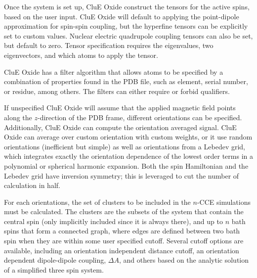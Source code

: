 \documentclass{book}
\begin{document}
Once the system is set up, CluE Oxide construct the tensors for the active spins,
based on the user input.  CluE Oxide will default to applying the point-dipole 
approximation for spin-spin coupling, but the hyperfine tensors can be 
explicitly set to custom values.  
Nuclear electric quadrupole coupling tensors can also be set, but default to 
zero.  Tensor specification requires the eigenvalues, two eigenvectors,
and which atoms to apply the tensor.

CluE Oxide has a filter algorithm that allows atoms to be specified by a combination 
of properties found in the PDB file, such as element, serial number, or residue,
among others.  The filters can either require or forbid qualifiers.
  
If unspecified CluE Oxide will assume that the applied magnetic field points
along the $z$-direction of the PDB frame, different orientations can be
specified.  Additionally, CluE Oxide can compute the orientation averaged signal.
CluE Oxide can average over custom orientation with custom weights, 
or it use random orientations (inefficient but simple) 
as well as orientations from a Lebedev grid, which integrates exactly 
the orientation dependence of the lowest order terms in a 
polynomial or spherical harmonic expansion\cite{1999_Lebedev}.  
Both the spin Hamiltonian and the Lebedev grid have inversion symmetry; 
this is leveraged to cut the number of calculation in half.

For each orientations, the set of clusters to be included in the $n$-CCE 
simulations must be calculated.  The clusters are the subsets of the system
that contain the central spin (only implicitly included since it is always 
there), and up to $n$ bath spins that form a connected graph, where edges are
defined between two bath spin when they are within some user specified cutoff.
Several cutoff options are available, including 
an orientation independent distance cutoff, 
an orientation dependent dipole-dipole coupling, $\Delta A$, and others
based on the analytic solution of a simplified three spin system.
\end{document}
